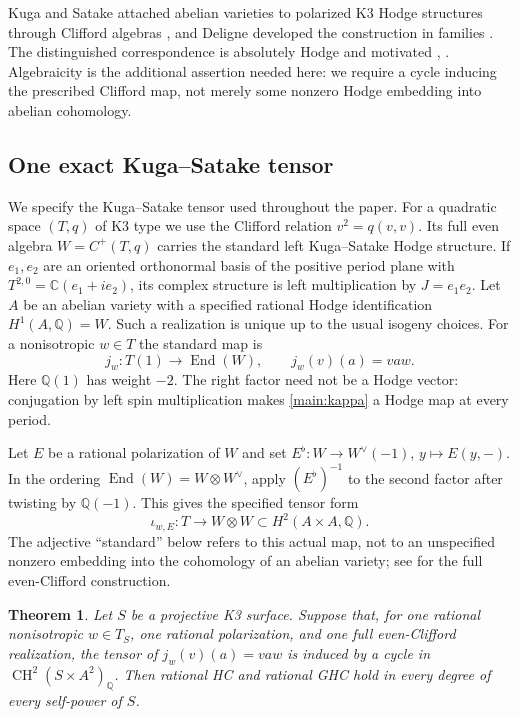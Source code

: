 \documentclass[11pt]{amsart}
\newcommand{\Q}{\mathbb Q}
\newcommand{\C}{\mathbb C}
\DeclareMathOperator{\CH}{CH}
\DeclareMathOperator{\End}{End}
\newtheorem{theorem}{Theorem}[section]
\theoremstyle{definition}
\theoremstyle{remark}
\numberwithin{equation}{section}
\begin{document}
Kuga and Satake attached abelian varieties to polarized K3 Hodge
structures through Clifford algebras \cite{KS}, and Deligne developed
the construction in families \cite{Deligne}.  The distinguished
correspondence is absolutely Hodge and motivated
\cite[Proposition~6.26\textup{(d)} and Corollary~6.27]{DeligneMilne},
\cite[Section~7.1]{Andre}.  Algebraicity is the additional assertion
needed here: we require a cycle inducing the prescribed Clifford map,
not merely some nonzero Hodge embedding into abelian cohomology.

\subsection{One exact Kuga--Satake tensor}

We specify the Kuga--Satake tensor used throughout the paper.  For a
quadratic space $(T,q)$ of K3 type we use the Clifford relation
$v^2=q(v,v)$.  Its full even algebra $W=C^+(T,q)$ carries the standard
left Kuga--Satake Hodge structure.  If $e_1,e_2$ are an oriented
orthonormal basis of the positive period plane with
$T^{2,0}=\C(e_1+ie_2)$, its complex structure is left multiplication
by $J=e_1e_2$.  Let $A$ be an abelian variety with a specified rational
Hodge identification $H^1(A,\Q)=W$.  Such a realization is unique up
to the usual isogeny choices.  For a nonisotropic $w\in T$ the
standard map is
\begin{equation}\label{main:kappa}
 j_w:T(1)\longrightarrow\End(W),\qquad j_w(v)(a)=vaw.
\end{equation}
Here $\Q(1)$ has weight $-2$.  The right factor need not be a Hodge
vector: conjugation by left spin multiplication makes
\eqref{main:kappa} a Hodge map at every period.

Let $E$ be a rational polarization of $W$ and set
$E^\flat:W\to W^\vee(-1)$, $y\mapsto E(y,-)$.
In the ordering $\End(W)=W\otimes W^\vee$, apply $(E^\flat)^{-1}$
to the second factor after twisting by $\Q(-1)$.  This gives the
specified tensor form
\begin{equation}\label{main:iota}
 \iota_{w,E}:T\longrightarrow W\otimes W
      \subset H^2(A\times A,\Q).
\end{equation}
The adjective ``standard'' below refers to this actual map, not to
an unspecified nonzero embedding into the cohomology of an abelian
variety; see \cite[Proposition~6.3]{VanGeemenKS} for the full
even-Clifford construction.

\begin{theorem}\label{ext:criterion}
Let $S$ be a projective K3 surface.  Suppose that, for one rational
nonisotropic $w\in T_S$, one rational polarization, and one full
even-Clifford realization, the tensor of $j_w(v)(a)=vaw$ is induced
by a cycle in $\CH^2(S\times A^2)_{\Q}$.
Then rational HC and rational GHC hold in every degree of every
self-power of $S$.
\end{theorem}
\end{document}
